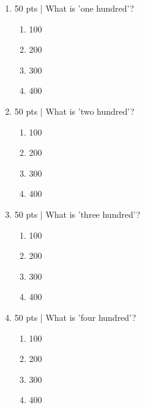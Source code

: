 \documentclass[a4paper,12pt]{article}
\begin{document}
\maketitle

\begin{enumerate}
	\item 50 pts | What is 'one hundred'?
		\begin{enumerate}
			\item 100
			\item 200
			\item 300
			\item 400
		\end{enumerate}
	\item 50 pts | What is 'two hundred'?
		\begin{enumerate}
			\item 100
			\item 200
			\item 300
			\item 400
		\end{enumerate}
	\item 50 pts | What is 'three hundred'?
		\begin{enumerate}
			\item 100
			\item 200
			\item 300
			\item 400
		\end{enumerate}
	\item 50 pts | What is 'four hundred'?
		\begin{enumerate}
			\item 100
			\item 200
			\item 300
			\item 400
		\end{enumerate}
\end{enumerate}
\end{document}
